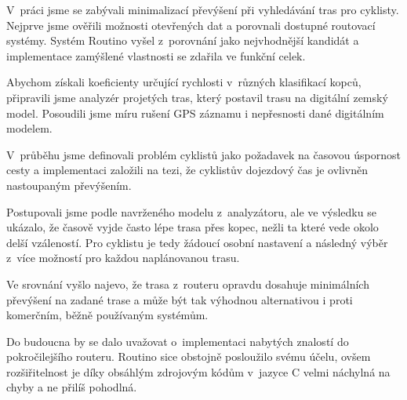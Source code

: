 \documentclass[thesis=B,czech]{FITthesis}[2012/06/26]
\begin{document}
\begin{conclusion}


V~práci jsme se zabývali minimalizací převýšení při vyhledávání tras pro cyklisty. Nejprve jsme ověřili možnosti otevřených dat a porovnali dostupné routovací systémy. Systém Routino vyšel z~porovnání jako nejvhodnější kandidát a implementace zamýšlené vlastnosti se zdařila ve funkční celek.

Abychom získali koeficienty určující rychlosti v~různých klasifikací kopců, připravili jsme analyzér projetých tras, který postavil trasu na digitální zemský model. Posoudili jsme míru rušení GPS záznamu i nepřesnosti dané digitálním modelem.

V~průběhu jsme definovali problém cyklistů jako požadavek na časovou úspornost cesty a implementaci založili na tezi, že cyklistův dojezdový čas je ovlivněn nastoupaným převýšením.

Postupovali jsme podle navrženého modelu z~analyzátoru, ale ve výsledku se ukázalo, že časově vyjde často lépe trasa přes kopec, nežli ta které vede okolo delší vzáleností. Pro cyklistu je tedy žádoucí osobní nastavení a následný výběr z~více možností pro každou naplánovanou trasu.

Ve srovnání vyšlo najevo, že trasa z~routeru opravdu dosahuje minimálních převýšení na zadané trase a může být tak výhodnou alternativou i proti komerčním, běžně používaným systémům.

Do budoucna by se dalo uvažovat o~implementaci nabytých znalostí do pokročilejšího routeru. Routino sice obstojně posloužilo svému účelu, ovšem rozšiřitelnost je díky obsáhlým zdrojovým kódům v~jazyce C velmi náchylná na chyby a ne přilíš pohodlná.


\end{conclusion}















\appendix
\end{document}
